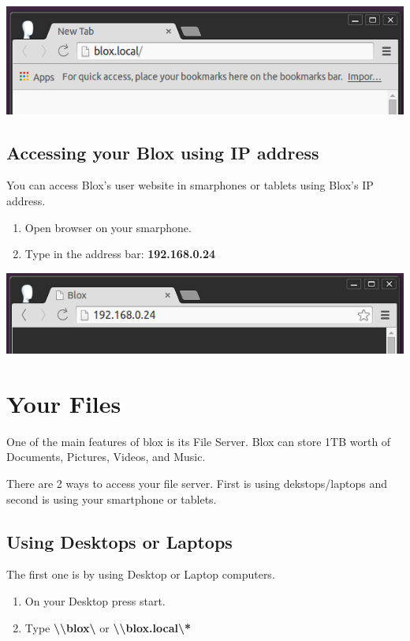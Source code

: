 \documentclass[letterpaper,10pt,english]{sphinxmanual}
\begin{document}
\begin{DUlineblock}{0em}
\item[] 
\item[] 
\end{DUlineblock}

\includegraphics{hostname.png}


\section{Accessing your Blox using IP address}
\label{gettingstarted:accessing-your-blox-using-ip}\label{gettingstarted:accessing-your-blox-using-ip-address}
You can access Blox's user website in smarphones or tablets using Blox's IP address.
\begin{enumerate}
\item {} 
Open browser on your smarphone.

\item {} 
Type in the address bar: \textbf{192.168.0.24}

\end{enumerate}

\includegraphics{ipaddress.png}


\chapter{Your Files}
\label{yourfiles::doc}\label{yourfiles:your-files}\label{yourfiles:id1}
One of the main features of blox is its File Server. Blox can store 1TB worth of Documents, Pictures, Videos, and Music.

There are 2 ways to access your file server. First is using dekstops/laptops and second is using your smartphone or tablets.


\section{Using Desktops or Laptops}
\label{yourfiles:using-desktops-or-laptops}\label{yourfiles:id2}
The first one is by using Desktop or Laptop computers.
\begin{enumerate}
\item {} 
On your Desktop press start.

\item {} 
Type \textbf{\textbackslash{}\textbackslash{}blox\textbackslash{}} or \textbf{\textbackslash{}\textbackslash{}blox.local\textbackslash{}*}

\end{enumerate}
\end{document}
